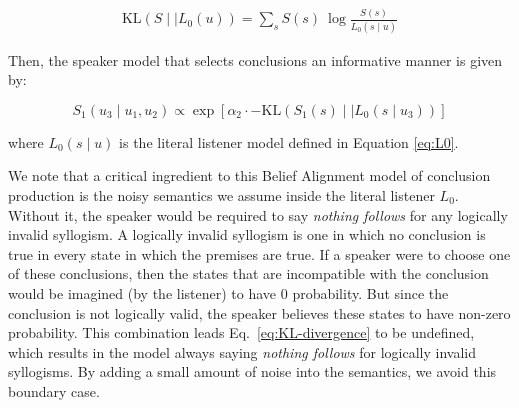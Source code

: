 \documentclass[floatsintext, doc]{apa6}
\begin{document}
\begin{align}
  \label{eq:KL-divergence}
  \text{KL}({S \mid \mid L_0}(u)) = \sum_{s} S(s) \ \log \frac{S(s)}{{L_{0}}(s \mid u)}
\end{align}

\noindent Then, the speaker model that selects conclusions an informative manner is given by: 

\begin{equation}
S_1(u_3 \mid u_1,  u_2) \propto  \exp [ \alpha_2 \cdot - \text{KL}({S_1(s) \mid \mid L_0}(s \mid u_3)) ]  \label{eq:R1b}
\end{equation}

\noindent where $L_0(s \mid u)$ is the literal listener model defined in Equation \ref{eq:L0}. 

We note that a critical ingredient to this Belief Alignment model of conclusion production is the noisy semantics we assume inside the literal listener $L_0$.
Without it, the speaker would be required to say \emph{nothing follows} for any logically invalid syllogism. 
A logically invalid syllogism is one in which no conclusion is true in every state in which the premises are true.
If a speaker were to choose one of these conclusions, then the states that are incompatible with the conclusion would be imagined (by the listener) to have 0 probability. 
But since the conclusion is not logically valid, the speaker believes these states to have non-zero probability.
This combination leads Eq.~\ref{eq:KL-divergence} to be undefined, which results in the model always saying \emph{nothing follows} for logically invalid syllogisms.
By adding a small amount of noise into the semantics, we avoid this boundary case.


%
%
%
%

\end{document}
